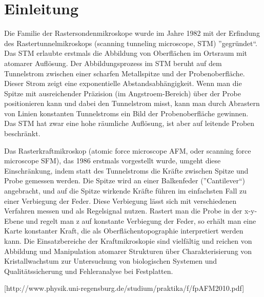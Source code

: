 \chapter{Einleitung}

Die Familie der Rastersondenmikroskope wurde im Jahre 1982 mit der Erfindung des Rastertunnelmikroskops (scanning tunneling microscope, STM) ”gegründet“.
Das STM erlaubte erstmals die Abbildung von Oberflächen im Ortsraum mit atomarer Auflösung.
Der Abbildungsprozess im STM beruht auf dem Tunnelstrom zwischen einer scharfen Metallspitze und der Probenoberfläche. 
Dieser Strom zeigt eine exponentielle Abstandsabhängigkeit. 
Wenn man die Spitze mit ausreichender Präzision (im Angstroem-Bereich) über der Probe positionieren kann und dabei den Tunnelstrom misst, kann man durch Abrastern von Linien konstanten Tunnelstroms ein Bild der Probenoberfläche gewinnen. 
Das STM hat zwar eine hohe räumliche Auflösung, ist aber auf leitende Proben beschränkt.

Das Rasterkraftmikroskop (atomic force microscope AFM, oder scanning force microscope SFM), das 1986 erstmals vorgestellt wurde, umgeht diese Einschränkung, indem statt des Tunnelstroms die Kräfte zwischen Spitze und Probe gemessen werden. 
Die Spitze wird an einer Balkenfeder (”Cantilever“) angebracht, und auf die Spitze wirkende Kräfte führen im einfachsten Fall zu einer Verbiegung der Feder. Diese Verbiegung lässt sich mit verschiedenen  Verfahren  messen  und  als  Regelsignal  nutzen.
Rastert  man  die  Probe in  der x-y-Ebene  und  regelt  man z auf  konstante  Verbiegung  der  Feder, so erhält man eine Karte konstanter Kraft, die als Oberflächentopographie interpretiert werden kann.
Die Einsatzbereiche der Kraftmikroskopie sind vielfältig und reichen von Abbildung  und  Manipulation  atomarer  Strukturen über  Charakterisierung von Kristallwachstum zur Untersuchung von biologischen Systemen und Qualitätssicherung und Fehleranalyse bei Festplatten.

[http://www.physik.uni-regensburg.de/studium/praktika/f/fpAFM2010.pdf]
